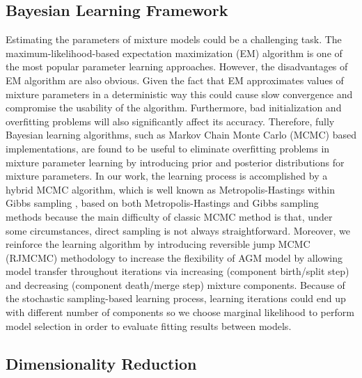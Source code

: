 \subsection{Bayesian Learning Framework}
\label{sec:1.3}
Estimating the parameters of mixture models could be a challenging task. The maximum-likelihood-based expectation maximization (EM) \cite{Dempster1977} algorithm is one of the most popular parameter learning approaches. However, the disadvantages of EM algorithm are also obvious. Given the fact that EM approximates values of mixture parameters in a deterministic way this could cause slow convergence and compromise the usability of the algorithm. Furthermore, bad initialization and overfitting problems \cite{Bouguila2009,Bouguila2012} will also significantly affect its accuracy. Therefore, fully Bayesian learning algorithms, such as Markov Chain Monte Carlo (MCMC) based implementations, are found to be useful to eliminate overfitting problems in mixture parameter learning by introducing prior and posterior distributions for mixture parameters. In our work, the learning process is accomplished by a hybrid MCMC algorithm, which is well known as Metropolis-Hastings within Gibbs sampling \cite{Bouguila2009,Bourouis2014}, based on both Metropolis-Hastings \cite{Hastings1970} and Gibbs sampling \cite{Geman1987} methods because the main difficulty of classic MCMC method is that, under some circumstances, direct sampling is not always straightforward. Moreover, we reinforce the learning algorithm by introducing reversible jump MCMC (RJMCMC) \cite{Richardson1997} methodology to increase the flexibility of AGM model by allowing model transfer throughout iterations via increasing (component birth/split step) and decreasing (component death/merge step) mixture components. Because of the stochastic sampling-based learning process, learning iterations could end up with different number of components so we choose marginal likelihood \cite{Bouguila2009} to perform model selection in order to evaluate fitting results between models.

\subsection{Dimensionality Reduction}
\label{sec:1.4}

